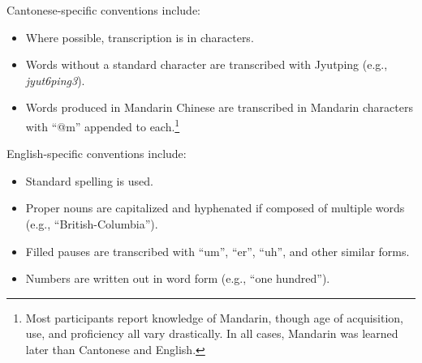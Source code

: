 Cantonese-specific conventions include:
\begin{itemize}
 \item Where possible, transcription is in characters.
 \item Words without a standard character are transcribed with Jyutping (e.g., \textit{jyut6ping3}).

 \item Words produced in Mandarin Chinese are transcribed in Mandarin characters with ``@m'' appended to each.\footnote{Most participants report knowledge of Mandarin, though age of acquisition, use, and proficiency all vary drastically. In all cases, Mandarin was learned later than Cantonese and English.}
\end{itemize}

English-specific conventions include:
\begin{itemize}
 \item Standard spelling is used.
 \item Proper nouns are capitalized and hyphenated if composed of multiple words (e.g., ``British-Columbia''). %
 \item Filled pauses are transcribed with ``um'', ``er'', ``uh'', and other similar forms.
 \item Numbers are written out in word form (e.g., ``one hundred'').
\end{itemize}

